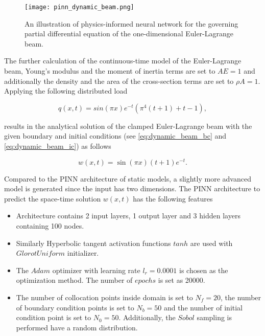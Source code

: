 \begin{figure}[!ht]
    \centering
    \texttt{[image: pinn\_dynamic\_beam.png]}  
    \caption{An illustration of physics-informed neural network for the governing
    partial differential equation of the one-dimensional Euler-Lagrange beam.}
    \label{fig:pinn_dynamic_beam}
\end{figure}


The further calculation of the continuous-time model of the Euler-Lagrange beam, Young’s modulus
and the moment of inertia terms are set to $AE = 1$ and additionally the density and the area of the cross-section terms 
are set to $\rho A=1$. Applying the following distributed load

\begin{equation}
    \label{eq:force_time}
    q(x,t) = sin(\pi x) e^{-t} \left( \pi^{4}(t+1)+t-1 \right), 
\end{equation}

\noindent results in the analytical solution of the clamped Euler-Lagrange beam with the given boundary 
and initial conditions (see \ref{eq:dynamic_beam_bc} and \ref{eq:dynamic_beam_ic}) as follows

\begin{equation}
    \label{eq:time_analytical}
    w(x,t) = \sin(\pi x)(t+1) e^{-t}.
\end{equation}


Compared to the PINN architecture of static models, a slightly more advanced model is generated since the input has two dimensions.
The PINN architecture to predict the space-time solution $w(x,t)$ has the following features

\begin{itemize}
    \item Architecture contains 2 input layers, 1 output layer and 3 hidden layers
    containing 100 nodes.
    \item Similarly Hyperbolic tangent activation functions $tanh$ are used with $Glorot Uniform$ initializer.
    \item The $Adam$ optimizer with learning rate $l_{r}=0.0001$ is chosen as the optimization method. 
    The number of $epochs$ is set as 20000. 
    \item The number of collocation points inside domain is set to $N_{f} = 20$, the number of boundary condition points is set
    to $N_{b}=50$ and the number of initial condition point is set to $N_{0}=50$. Additionally, the $Sobol$ sampling
    is performed have a random distribution.
\end{itemize}

